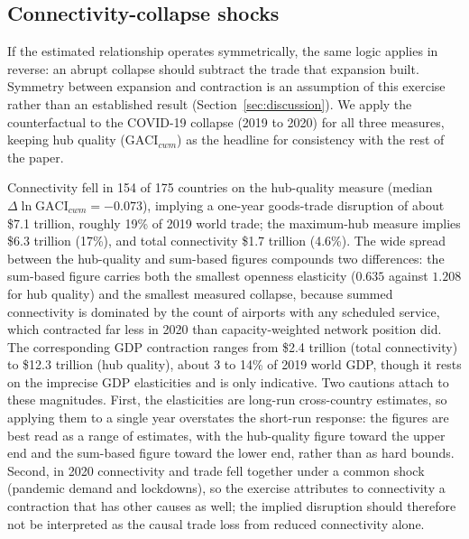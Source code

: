 \subsection{Connectivity-collapse shocks}
If the estimated relationship operates symmetrically, the same logic applies in reverse: an abrupt collapse should subtract the trade that expansion built. Symmetry between expansion and contraction is an assumption of this exercise rather than an established result (Section~\ref{sec:discussion}). We apply the counterfactual to the COVID-19 collapse (2019 to 2020) for all three measures, keeping hub quality ($\mathrm{GACI}_{cwm}$) as the headline for consistency with the rest of the paper. 

Connectivity fell in 154 of 175 countries on the hub-quality measure (median $\Delta\ln\mathrm{GACI}_{cwm}=-0.073$), implying a one-year goods-trade disruption of about \$7.1 trillion, roughly 19\% of 2019 world trade; the maximum-hub measure implies \$6.3 trillion (17\%), and total connectivity \$1.7 trillion (4.6\%). The wide spread between the hub-quality and sum-based figures compounds two differences: the sum-based figure carries both the smallest openness elasticity ($0.635$ against $1.208$ for hub quality) and the smallest measured collapse, because summed connectivity is dominated by the count of airports with any scheduled service, which contracted far less in 2020 than capacity-weighted network position did. The corresponding GDP contraction ranges from \$2.4 trillion (total connectivity) to \$12.3 trillion (hub quality), about 3 to 14\% of 2019 world GDP, though it rests on the imprecise GDP elasticities and is only indicative. Two cautions attach to these magnitudes. First, the elasticities are long-run cross-country estimates, so applying them to a single year overstates the short-run response: the figures are best read as a range of estimates, with the hub-quality figure toward the upper end and the sum-based figure toward the lower end, rather than as hard bounds. Second, in 2020 connectivity and trade fell together under a common shock (pandemic demand and lockdowns), so the exercise attributes to connectivity a contraction that has other causes as well; the implied disruption should therefore not be interpreted as the causal trade loss from reduced connectivity alone. 

